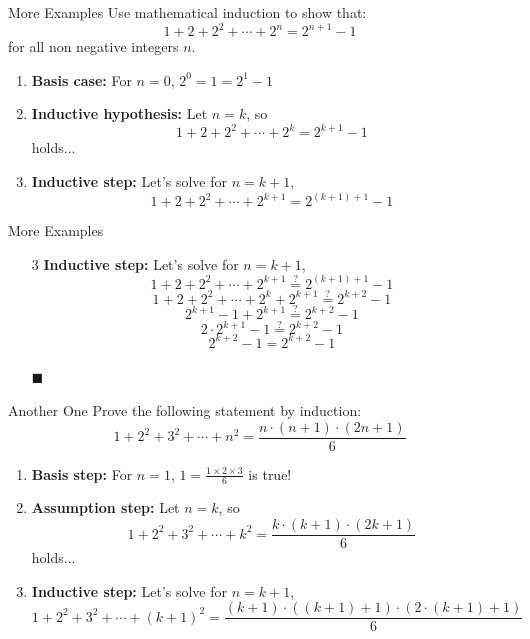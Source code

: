 \documentclass{beamer}
\renewcommand{\qed}{\\ \hfill $\blacksquare$}
\begin{document}
\begin{frame}{More Examples}
    \footnotesize
    Use mathematical induction to show that:
    $$
        1 + 2 + 2^2 + \cdots + 2^n = 2^{n + 1} - 1
    $$
    for all non negative integers $n$.

   \begin{enumerate}[<+->]
        \item \textbf{Basis case:} For $n = 0$, $2^0 = 1 = 2^1 - 1$ \checkmark
        \item \textbf{Inductive hypothesis:} Let $n = k$, so $$ 1 + 2 + 2^2 + \cdots + 2^k = 2^{k + 1} - 1 $$ holds...
        \item \textbf{Inductive step:} Let's solve for $n = k + 1$,
        $$
            1 + 2 + 2^2 + \cdots + 2^{k + 1} = 2^{(k + 1) + 1} - 1
        $$
   \end{enumerate}
\end{frame}

\begin{frame}{More Examples}
    \footnotesize
    \begin{enumerate}
        \item[3] \textbf{Inductive step:} Let's solve for $n = k + 1$, \pause
            $$ 1 + 2 + 2^2 + \cdots + 2^{k + 1} \stackrel{?}{=} 2^{(k + 1) + 1} - 1$$ \pause
            $$ 1 + 2 + 2^2 + \cdots + 2^k + 2^{k + 1} \stackrel{?}{=} 2^{k + 2} - 1$$ \pause
            $$ 2^{k + 1} - 1 + 2^{k + 1} \stackrel{?}{=} 2^{k + 2} - 1 $$ \pause
            $$ 2 \cdot 2^{k + 1} - 1 \stackrel{?}{=} 2^{k + 2} - 1 $$ \pause
            $$ 2^{k + 2} - 1 = 2^{k + 2} - 1 $$ \qed
    \end{enumerate}
\end{frame}

\begin{frame}{Another One}
    \footnotesize
    Prove the following statement by induction:
    $$
        1 + 2^2 + 3^2 + \cdots + n^2 = \frac{n \cdot (n + 1) \cdot (2n + 1)}{6}
    $$
    \begin{enumerate}[<+->]
        \item \textbf{Basis step:} For $n = 1$, $1 = \frac {1 \times 2 \times 3}{6}$ is true!
        \item \textbf{Assumption step:} Let $n = k$, so $$ 1 + 2^2 + 3^2 + \cdots + k^2 = \frac{k \cdot (k + 1) \cdot (2k + 1)}{6} $$ holds...
        \item \textbf{Inductive step:} Let's solve for $n = k + 1$,
        $$ 1 + 2^2 + 3^2 + \cdots + (k + 1)^2 = \frac{(k + 1) \cdot ((k + 1) + 1) \cdot (2 \cdot (k + 1) + 1)}{6} $$
    \end{enumerate}
\end{frame}
\end{document}

